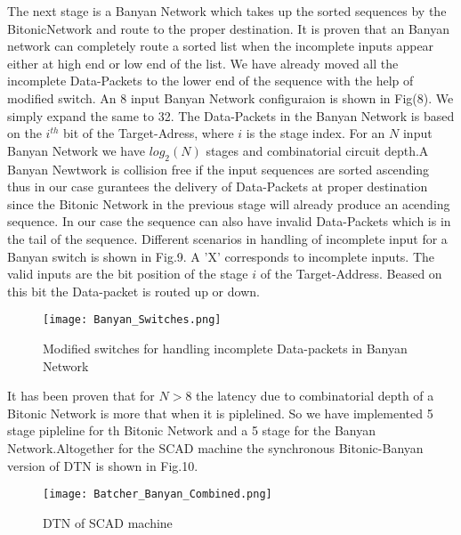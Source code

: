 					      The next stage is a Banyan Network which takes up the sorted sequences by the BitonicNetwork and route to the proper destination. It is proven \cite{batcher_banyan_ref} that 
					      an Banyan network can completely route a sorted list when the incomplete inputs appear either at high end or low end of the list. We have already moved all the incomplete Data-Packets
					      to the lower end of the sequence with the help of modified switch. An 8 input Banyan Network configuraion is shown in Fig(8). We simply expand the same to 32.
					      The Data-Packets in the Banyan Network is based on the $i^{th}$ bit of the Target-Adress, where $i$ is the stage index. For an $N$ input Banyan Network we have $log_{2}(N)$ 
					      stages and combinatorial circuit depth.A Banyan Newtwork is collision free if the input sequences are sorted ascending
					      thus in our case gurantees the delivery of Data-Packets at proper destination since the Bitonic Network in the previous stage will already produce an acending sequence. In our case 
					      the sequence can also have invalid Data-Packets which is in the tail of the sequence. Different scenarios in handling of incomplete input for a Banyan switch is shown in Fig.9. A 'X'
					      corresponds to incomplete inputs. The valid inputs are the bit position of the stage $i$ of the Target-Address. Beased on this bit the Data-packet is routed up or down.
					      \begin{figure}[!ht]
						      \texttt{[image: Banyan\_Switches.png]}
						      \caption{Modified switches for handling incomplete Data-packets in Banyan Network }
					      \end{figure}
					      It has been proven \cite{sorting_network_on_fpgas} that for $N > 8$ the latency
					      due to combinatorial depth of a Bitonic Network is more that when it is piplelined. So we have implemented 5 stage pipleline for th Bitonic Network and a 5 stage for 
					      the Banyan Network.Altogether for the SCAD machine the synchronous Bitonic-Banyan version of DTN is shown in Fig.10.
					      \begin{figure}[!ht]
						      \texttt{[image: Batcher\_Banyan\_Combined.png]}
						      \caption{DTN of SCAD machine}
					      \end{figure}

